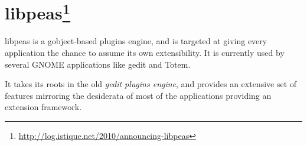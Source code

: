 
\section[libpeas]{libpeas\footnote{\url{http://log.istique.net/2010/announcing-libpeas}}}\label{peas}

libpeas is a gobject-based plugins engine, and is targeted at giving every application the chance to assume its own extensibility. It is currently used by several GNOME applications like gedit and Totem.

It takes its roots in the old \emph{gedit plugins engine}, and provides an extensive set of features mirroring the desiderata of most of the applications providing an extension framework.
